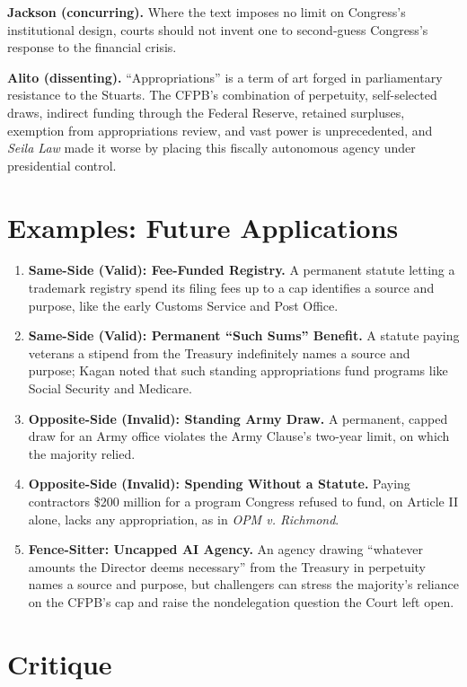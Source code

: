 \documentclass[12pt]{article}
\begin{document}
\textbf{Jackson (concurring).} Where the text imposes no limit on Congress's institutional design, courts should not invent one to second-guess Congress's response to the financial crisis.

\textbf{Alito (dissenting).} ``Appropriations'' is a term of art forged in parliamentary resistance to the Stuarts. The CFPB's combination of perpetuity, self-selected draws, indirect funding through the Federal Reserve, retained surpluses, exemption from appropriations review, and vast power is unprecedented, and \textit{Seila Law} made it worse by placing this fiscally autonomous agency under presidential control.

\section{Examples: Future Applications}

\begin{enumerate}
\item \textbf{Same-Side (Valid): Fee-Funded Registry.} A permanent statute letting a trademark registry spend its filing fees up to a cap identifies a source and purpose, like the early Customs Service and Post Office.
\item \textbf{Same-Side (Valid): Permanent ``Such Sums'' Benefit.} A statute paying veterans a stipend from the Treasury indefinitely names a source and purpose; Kagan noted that such standing appropriations fund programs like Social Security and Medicare.
\item \textbf{Opposite-Side (Invalid): Standing Army Draw.} A permanent, capped draw for an Army office violates the Army Clause's two-year limit, on which the majority relied.
\item \textbf{Opposite-Side (Invalid): Spending Without a Statute.} Paying contractors \$200 million for a program Congress refused to fund, on Article II alone, lacks any appropriation, as in \textit{OPM v. Richmond}.
\item \textbf{Fence-Sitter: Uncapped AI Agency.} An agency drawing ``whatever amounts the Director deems necessary'' from the Treasury in perpetuity names a source and purpose, but challengers can stress the majority's reliance on the CFPB's cap and raise the nondelegation question the Court left open.
\end{enumerate}

\section{Critique}
\end{document}
